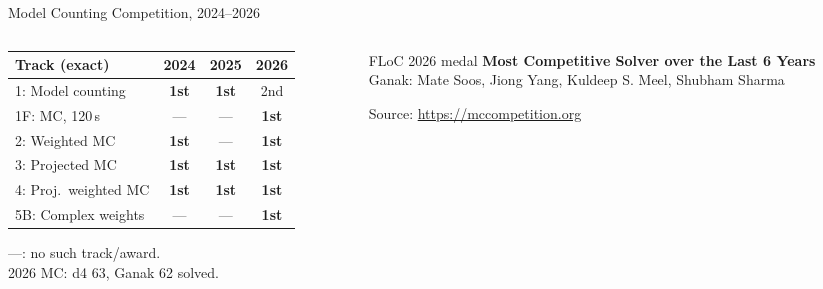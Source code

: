 \documentclass[aspectratio=169]{beamer}
\newcommand{\ganak}{\textsf{Ganak}}
\newcommand{\dfour}{\textsf{d4}}
\begin{document}
\begin{frame}{Model Counting Competition, 2024--2026}
  \begin{columns}[T]
    \begin{column}{0.60\textwidth}
      \centering\small
      \begin{tabular}{@{}lccc@{}}
        \toprule
        Track (exact)               & 2024 & 2025 & 2026 \\
        \midrule
        1: Model counting           & \textbf{1st} & \textbf{1st} & 2nd \\
        1F: MC, 120\,s              & ---  & ---  & \textbf{1st} \\
        2: Weighted MC              & \textbf{1st} & --- & \textbf{1st} \\
        3: Projected MC             & \textbf{1st} & \textbf{1st} & \textbf{1st} \\
        4: Proj.\ weighted MC       & \textbf{1st} & \textbf{1st} & \textbf{1st} \\
        5B: Complex weights         & ---  & --- & \textbf{1st} \\
        \bottomrule
      \end{tabular}

      \medskip
      \scriptsize
      ---: no such track/award.\\
      2026 MC: \dfour{} 63, \ganak{} 62 solved.
    \end{column}
    \begin{column}{0.38\textwidth}
      \begin{alertblock}{\small FLoC 2026 medal}
        \small \textbf{Most Competitive Solver over the Last 6 Years}\\[2pt]
        \ganak{}: Mate Soos, Jiong Yang, Kuldeep S. Meel, Shubham Sharma
      \end{alertblock}
      \scriptsize Source: \url{https://mccompetition.org}
    \end{column}
  \end{columns}
\end{frame}

\end{document}
